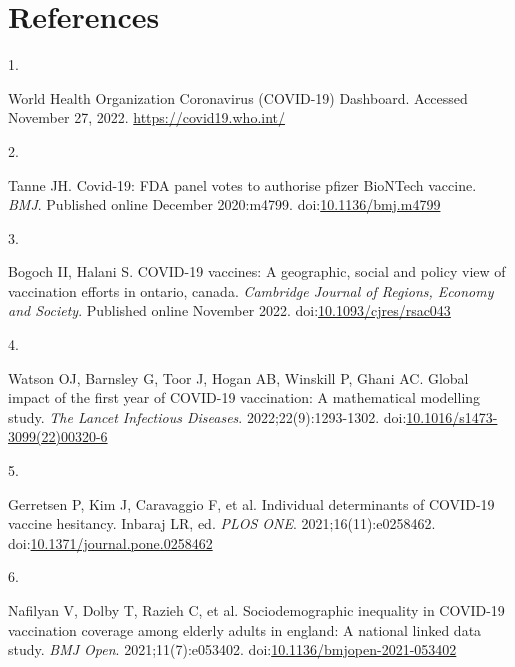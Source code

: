 \documentclass[
  letterpaper,
  DIV=11,
  numbers=noendperiod]{scrartcl}
\newlength{\cslhangindent}
\newlength{\csllabelwidth}
\newlength{\cslentryspacingunit} %
\newenvironment{CSLReferences}[2] %
 {%
  \setlength{\parindent}{0pt}
  \ifodd #1
  \let\oldpar\par
  \def\par{\hangindent=\cslhangindent\oldpar}
  \fi
  \setlength{\parskip}{#2\cslentryspacingunit}
 }%
 {}
\newcommand{\CSLLeftMargin}[1]{\parbox[t]{\csllabelwidth}{#1}}
\newcommand{\CSLRightInline}[1]{\parbox[t]{\linewidth - \csllabelwidth}{#1}\break}
\begin{document}
\hypertarget{references}{%
\section{References}\label{references}}

\hypertarget{refs}{}
\begin{CSLReferences}{0}{0}
\leavevmode{}%
\CSLLeftMargin{1. }%
\CSLRightInline{{World Health Organization Coronavirus (COVID-19)
Dashboard}. Accessed November 27, 2022. \url{https://covid19.who.int/}}

\leavevmode{}%
\CSLLeftMargin{2. }%
\CSLRightInline{Tanne JH. Covid-19: {FDA} panel votes to authorise
pfizer {BioNTech} vaccine. \emph{{BMJ}}. Published online December
2020:m4799.
doi:\href{https://doi.org/10.1136/bmj.m4799}{10.1136/bmj.m4799}}

\leavevmode{}%
\CSLLeftMargin{3. }%
\CSLRightInline{Bogoch II, Halani S. {COVID}-19 vaccines: A geographic,
social and policy view of vaccination efforts in ontario, canada.
\emph{Cambridge Journal of Regions, Economy and Society}. Published
online November 2022.
doi:\href{https://doi.org/10.1093/cjres/rsac043}{10.1093/cjres/rsac043}}

\leavevmode{}%
\CSLLeftMargin{4. }%
\CSLRightInline{Watson OJ, Barnsley G, Toor J, Hogan AB, Winskill P,
Ghani AC. Global impact of the first year of {COVID}-19 vaccination: A
mathematical modelling study. \emph{The Lancet Infectious Diseases}.
2022;22(9):1293-1302.
doi:\href{https://doi.org/10.1016/s1473-3099(22)00320-6}{10.1016/s1473-3099(22)00320-6}}

\leavevmode{}%
\CSLLeftMargin{5. }%
\CSLRightInline{Gerretsen P, Kim J, Caravaggio F, et al. Individual
determinants of {COVID}-19 vaccine hesitancy. Inbaraj LR, ed.
\emph{{PLOS} {ONE}}. 2021;16(11):e0258462.
doi:\href{https://doi.org/10.1371/journal.pone.0258462}{10.1371/journal.pone.0258462}}

\leavevmode{}%
\CSLLeftMargin{6. }%
\CSLRightInline{Nafilyan V, Dolby T, Razieh C, et al. Sociodemographic
inequality in {COVID}-19 vaccination coverage among elderly adults in
england: A national linked data study. \emph{{BMJ} Open}.
2021;11(7):e053402.
doi:\href{https://doi.org/10.1136/bmjopen-2021-053402}{10.1136/bmjopen-2021-053402}}


\end{CSLReferences}
\end{document}

